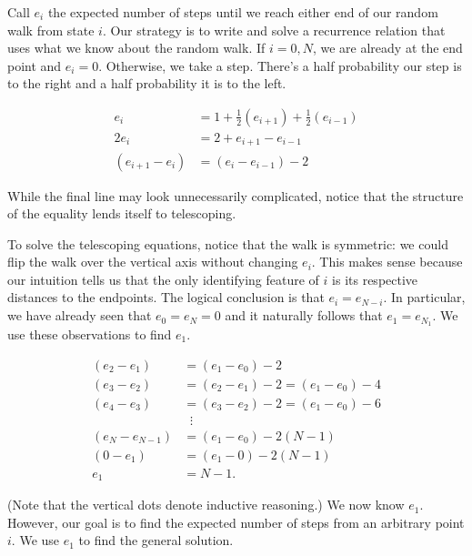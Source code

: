 \documentclass[12pt]{article}
\theoremstyle{definition}
\begin{document}
Call $e_i$ the expected number of steps until we reach either
end of our random walk from state $i$.
Our strategy is to write and solve a recurrence relation that
uses what we know about the random walk.
If $i=0,N$, we are already at the end point and $e_i=0$.
Otherwise, we take a step.
There's a half probability our step is to the right and
a half probability it is to the left.

\begin{align}
e_i &= 1 + \frac{1}{2} \left(e_{i+1}\right) + \frac{1}{2}\left(e_{i-1}\right) \nonumber \\
2 e_i &= 2 + e_{i+1} - e_{i-1} \nonumber \\
\left(e_{i+1} - e_i\right) &=\left( e_i - e_{i-1}\right) - 2 \nonumber
\end{align}

While the final line may look unnecessarily complicated,
notice that the structure of the equality lends itself to telescoping.

To solve the telescoping equations, notice that the walk is symmetric:
we could flip the walk over the vertical axis without changing $e_i$.
This makes sense because our intuition tells us that the only 
identifying feature of $i$ is its respective distances to the endpoints.
The logical conclusion is that $e_i=e_{N-i}$.
In particular, we have already seen that $e_0=e_N=0$ and it
naturally follows that $e_1=e_{N_1}$.
We use these observations to find $e_1$.

\begin{align}
\left(e_{2} - e_1\right) &= \left(e_1 - e_{0}\right) - 2 \nonumber \\
\left(e_{3} - e_2\right) &= \left(e_2 - e_{1}\right) - 2 = \left(e_1 - e_{0}\right) - 4\nonumber \\
\left(e_{4} - e_3\right) &= \left(e_3 - e_{2}\right) - 2 = \left(e_1 - e_{0}\right) - 6\nonumber \\
&\;\;\vdots \nonumber\\
\left(e_N - e_{N-1}\right) &= \left(e_1 - e_0\right) - 2 (N-1) \nonumber \\
\left(0 - e_1\right) &= \left(e_1 - 0\right) - 2 (N-1) \nonumber \\
e_1 &= N-1. \nonumber
\end{align}

(Note that the vertical dots denote inductive reasoning.)
We now know $e_1$.
However, our goal is to find the expected number of steps
from an arbitrary point $i$.
We use $e_1$ to find the general solution.
\end{document}
